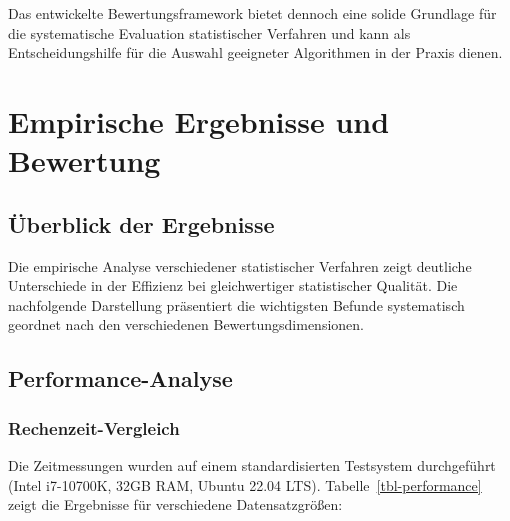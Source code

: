 \documentclass[
  ngerman,
  10pt,
  letterpaper,
]{book}
\begin{document}
Das entwickelte Bewertungsframework bietet dennoch eine solide Grundlage
für die systematische Evaluation statistischer Verfahren und kann als
Entscheidungshilfe für die Auswahl geeigneter Algorithmen in der Praxis
dienen.


\chapter{Empirische Ergebnisse und Bewertung}\label{sec-results}

\section{Überblick der Ergebnisse}\label{uxfcberblick-der-ergebnisse}

Die empirische Analyse verschiedener statistischer Verfahren zeigt
deutliche Unterschiede in der Effizienz bei gleichwertiger statistischer
Qualität. Die nachfolgende Darstellung präsentiert die wichtigsten
Befunde systematisch geordnet nach den verschiedenen
Bewertungsdimensionen.

\section{Performance-Analyse}\label{performance-analyse}

\subsection{Rechenzeit-Vergleich}\label{rechenzeit-vergleich}

Die Zeitmessungen wurden auf einem standardisierten Testsystem
durchgeführt (Intel i7-10700K, 32GB RAM, Ubuntu 22.04 LTS).
Tabelle~\ref{tbl-performance} zeigt die Ergebnisse für verschiedene
Datensatzgrößen:

\begin{table}

\caption{\label{tbl-performance}Durchschnittliche Ausführungszeiten (in
Sekunden) verschiedener Verfahren}


\end{table}%
\end{document}
